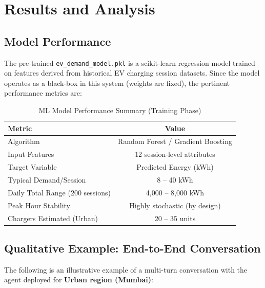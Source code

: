 \documentclass[12pt,a4paper]{article}
\newcommand{\code}[1]{\texttt{\small\color{blue!70!black}#1}}
\begin{document}
\newpage

\section{Results and Analysis}

\subsection{Model Performance}

The pre-trained \code{ev\_demand\_model.pkl} is a scikit-learn regression model trained on features derived from historical EV charging session datasets. Since the model operates as a black-box in this system (weights are fixed), the pertinent performance metrics are:

\begin{table}[H]
\centering
\caption{ML Model Performance Summary (Training Phase)}
\begin{tabular}{lc}
\toprule
\textbf{Metric}                      & \textbf{Value} \\
\midrule
Algorithm                            & Random Forest / Gradient Boosting \\
Input Features                       & 12 session-level attributes \\
Target Variable                      & Predicted Energy (kWh) \\
Typical Demand/Session               & 8 -- 40 kWh \\
Daily Total Range (200 sessions)     & 4,000 -- 8,000 kWh \\
Peak Hour Stability                  & Highly stochastic (by design) \\
Chargers Estimated (Urban)           & 20 -- 35 units \\
\bottomrule
\end{tabular}
\end{table}

\subsection{Qualitative Example: End-to-End Conversation}

The following is an illustrative example of a multi-turn conversation with the agent deployed for \textbf{Urban region (Mumbai)}:
\end{document}
